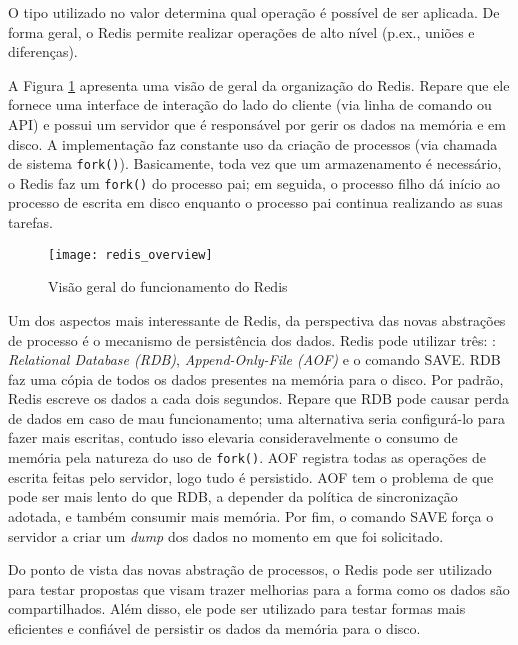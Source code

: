 O tipo utilizado no valor determina qual operação é possível de ser aplicada.
De forma geral, o Redis permite realizar operações de alto nível (p.ex., uniões
e diferenças).

A Figura \ref{fig:redis} apresenta uma visão de geral da organização do Redis.
Repare que ele fornece uma interface de interação do lado do cliente (via
linha de comando ou API) e possui um servidor que é responsável por gerir os dados na memória e em disco.
A implementação faz constante uso da criação de processos (via
chamada de sistema \texttt{fork()}). Basicamente, toda vez que um armazenamento
é necessário, o Redis faz um \texttt{fork()} do processo pai; em seguida, o
processo filho dá início ao processo de escrita em disco enquanto o processo
pai continua realizando as suas tarefas. 

\begin{figure}[!h]
  \centering
  \texttt{[image: redis\_overview]}
  \caption{Visão geral do funcionamento do Redis}
  \label{fig:redis}
\end{figure}

Um dos aspectos mais interessante de Redis, da perspectiva das novas
abstrações de processo é o mecanismo de persistência dos dados. Redis pode
utilizar três: \citep{redisio}: \emph{Relational Database (RDB)},
\emph{Append-Only-File (AOF)} e o comando SAVE. RDB faz uma cópia de todos os
dados presentes na memória para o disco. Por padrão, Redis escreve os dados a
cada dois segundos. Repare que RDB pode causar perda de dados em caso de mau
funcionamento; uma alternativa seria configurá-lo para fazer mais escritas,
contudo isso elevaria consideravelmente o consumo de memória pela natureza do
uso de \texttt{fork()}. AOF registra todas as operações de escrita feitas pelo
servidor, logo tudo é persistido. AOF tem o problema de que pode ser mais lento
do que RDB, a depender da política de sincronização adotada, e também consumir
mais memória.  Por fim, o comando SAVE força o servidor a criar um \emph{dump}
dos dados no momento em que foi solicitado.


Do ponto de vista das novas abstração de processos, o Redis pode ser utilizado
para testar propostas que visam trazer melhorias para a forma como os dados são
compartilhados. Além disso, ele pode ser utilizado para testar formas mais
eficientes e confiável de persistir os dados da memória para o disco.

